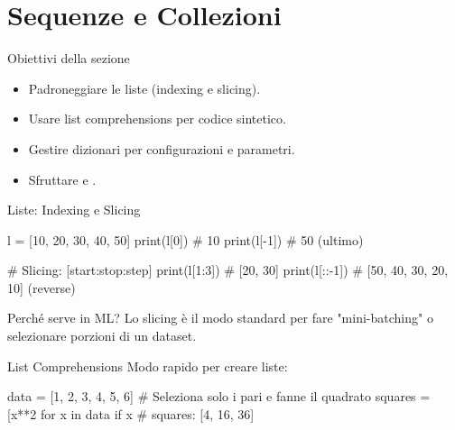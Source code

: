 \documentclass[12pt,aspectratio=169,notheorems]{beamer}
\begin{document}
\section{Sequenze e Collezioni}

\begin{frame}{Obiettivi della sezione}
    \begin{itemize}
        \item Padroneggiare le liste (indexing e slicing).
        \item Usare list comprehensions per codice sintetico.
        \item Gestire dizionari per configurazioni e parametri.
        \item Sfruttare  e .
    \end{itemize}
\end{frame}

\begin{frame}[fragile]{Liste: Indexing e Slicing}
    \begin{python}
        l = [10, 20, 30, 40, 50]
        print(l[0])    # 10
        print(l[-1])   # 50 (ultimo)

        # Slicing: [start:stop:step]
        print(l[1:3])  # [20, 30]
        print(l[::-1]) # [50, 40, 30, 20, 10] (reverse)
    \end{python}
    \begin{mlblock}{Perché serve in ML?}
        Lo slicing è il modo standard per fare "mini-batching" o selezionare porzioni di un dataset.
    \end{mlblock}
\end{frame}

\begin{frame}[fragile]{List Comprehensions}
    Modo rapido per creare liste:


    \begin{python}
        data = [1, 2, 3, 4, 5, 6]
        # Seleziona solo i pari e fanne il quadrato
        squares = [x**2 for x in data if x %
        # squares: [4, 16, 36]
    \end{python}
\end{frame}
\end{document}
